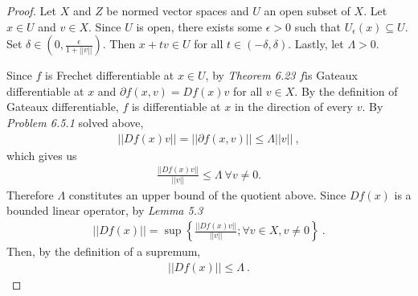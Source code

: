 \begin{questions}


\begin{solution}
  \begin{proof}
Let $X$ and $Z$ be normed vector spaces and $U$ an open subset of $X$. Let $x\in U$ and $v\in X$. Since $U$ is open, there exists some $\epsilon>0$ such that $U_{\epsilon}(x)\subseteq U$. Set $\delta\in (0,\frac{\epsilon}{1+||v||})$. Then $x+tv\in U$ for all $t\in(-\delta,\delta)$. Lastly, let $\Lambda>0$.

Since $f$ is Frechet differentiable at $x\in U$, by \textit{Theorem 6.23} $f$is Gateaux differentiable at $x$ and $\partial f(x,v)=Df(x)v$ for all $v\in X$. By the definition of Gateaux differentiable, $f$ is differentiable at $x$ in the direction of every $v$. By \textit{Problem 6.5.1} solved above,
\begin{align*}
||Df(x)v||=||\partial f(x,v)||\leq \Lambda||v||~,
\end{align*}
which gives us
\begin{align*}
\frac{||Df(x)v||}{||v||}\leq \Lambda~\forall v\neq 0.
\end{align*}
Therefore $\Lambda$ constitutes an upper bound of the quotient above. Since $Df(x)$ is a bounded linear operator, by \textit{Lemma 5.3}
\begin{align*}
||Df(x)||=\sup \left\{\frac{||Df(x)v||}{||v||};\forall v\in  X, v\neq 0\right\}~.
\end{align*}
Then, by the definition of a supremum,
\begin{align*}
||Df(x)||\leq \Lambda~.
\end{align*}
\end{proof}
\end{solution}
\end{questions}